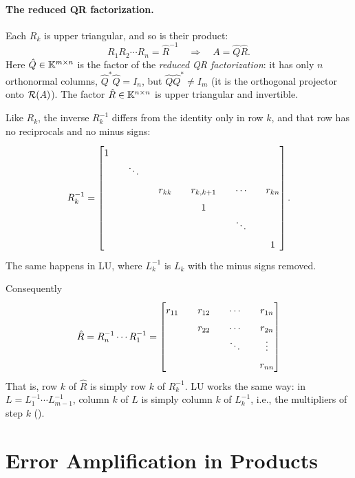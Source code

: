 \paragraph{The reduced QR factorization.} Each $R_k$ is upper triangular, and so is their product:
\begin{equation}
  R_1R_2 \cdots R_n = \hat{R}^{-1} \quad\Longrightarrow\quad A = \hat{Q}\hat{R}.
\end{equation}
Here $\hat{Q} \in \mathbb{K}^{m \times n}$ is the factor of the \emph{reduced QR factorization}: it has only $n$ orthonormal columns, $\hat{Q}^\ast\hat{Q} = I_n$, but $\hat{Q}\hat{Q}^\ast \ne I_m$ (it is the orthogonal projector onto $\mathcal{R}(A)$). The factor $\hat{R} \in \mathbb{K}^{n \times n}$ is upper triangular and invertible.

Like $R_k$, the inverse $R_k^{-1}$ differs from the identity only in row $k$, and that row has no reciprocals and no minus signs:
\begin{equation}
  R_k^{-1} = \renewcommand{\arraystretch}{1.5}\setlength{\arraycolsep}{10pt}\begin{bmatrix}
    1 & & & & & \\
    & \ddots & & & & \\
    & & r_{kk} & r_{k,k+1} & \cdots & r_{kn} \\
    & & & 1 & & \\
    & & & & \ddots & \\
    & & & & & 1
  \end{bmatrix}.
\end{equation}
The same happens in LU, where $L_k^{-1}$ is $L_k$ with the minus signs removed.

Consequently
\begin{equation}
  \hat{R} = R_n^{-1} \cdots R_1^{-1} = \renewcommand{\arraystretch}{1.5}\setlength{\arraycolsep}{10pt}\begin{bmatrix} r_{11} & r_{12} & \cdots & r_{1n} \\ & r_{22} & \cdots & r_{2n} \\ & & \ddots & \vdots \\ & & & r_{nn} \end{bmatrix}
\end{equation}
That is, row $k$ of $\hat{R}$ is simply row $k$ of $R_k^{-1}$. LU works the same way: in $L = L_1^{-1} \cdots L_{m-1}^{-1}$, column $k$ of $L$ is simply column $k$ of $L_k^{-1}$, i.e., the multipliers of step $k$ ().

\clearpage
\section{Error Amplification in Products}
\label{sec:error-products}

